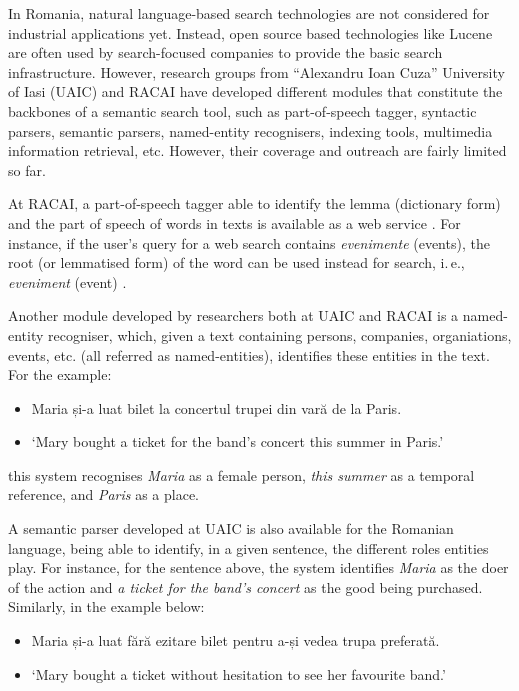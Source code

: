 \begin{multicols}{2}
In Romania, natural language-based search technologies are not considered for industrial applications yet. Instead, open source based technologies like Lucene are often used by search-focused companies to provide the basic search infrastructure. However, research groups from “Alexandru Ioan Cuza” University of Iasi (UAIC) and RACAI have developed different modules that constitute the backbones of a semantic search tool, such as part-of-speech tagger, syntactic parsers, semantic parsers, named-entity recognisers, indexing tools, multimedia information retrieval, etc. However, their coverage and outreach are fairly limited so far.

At RACAI, a part-of-speech tagger able to identify the lemma (dictionary form) and the part of speech of words in texts is available as a web service \cite{webservicesUrl}. For instance, if the user’s query for a web search contains \textit{evenimente} (events), the root (or lemmatised form) of the word can be used instead for search, i.\,e., \textit{eveniment} (event) \cite{webservicesArt}. 

Another module developed by researchers both at UAIC and RACAI is a named-entity recogniser, which, given a text containing persons, companies, organiations, events, etc. (all referred as named-entities), identifies these entities in the text. For the example:

\begin{example}
\begin{itemize}
\item []Maria și-a luat bilet la concertul trupei din vară de la Paris.
\item []`Mary bought a ticket for the band’s concert this summer in Paris.'
\end{itemize}
\end{example}

\noindent this system recognises \textit{Maria} as a female person, \textit{this summer} as a temporal reference, and \textit{Paris} as a place.

A semantic parser developed at UAIC \cite{isda} is also available for the Romanian language, being able to identify, in a given sentence, the different roles entities play. For instance, for the sentence above, the system identifies \textit{Maria} as the doer of the action and \textit{a ticket for the band’s concert} as the good being purchased. Similarly, in the example below: 

\begin{example}
\begin{itemize}
\item []Maria și-a luat fără ezitare bilet pentru a-și vedea trupa preferată.
\item []`Mary bought a ticket without hesitation to see her favourite band.'
\end{itemize}
\end{example}


\end{multicols}
